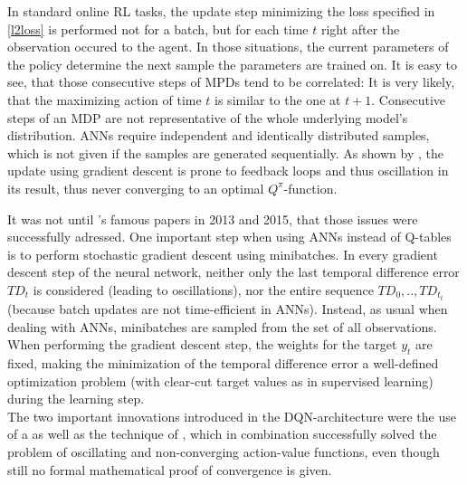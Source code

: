 In standard online RL tasks, the update step minimizing the loss specified in \ref{l2loss} is performed not for a batch, but for each time $t$ right after the observation occured to the agent. 
In those situations, the current parameters of the policy determine the next sample the parameters are trained on. It is easy to see, that those consecutive steps of MPDs tend to be correlated: It is very likely, that the maximizing action of time $t$ is similar to the one at $t+1$. Consecutive steps of an MDP are not representative of the whole underlying model's distribution. ANNs require independent and identically distributed samples, which is not given if the samples are generated sequentially. As shown by \cite{john_n._tsitsiklis_analysis_1997}, the update using gradient descent is prone to feedback loops and thus oscillation in its result, thus never converging to an optimal $Q^\pi$-function. 

It was not until 's famous papers in 2013\cite{mnih_playing_2013} and 2015\cite{mnih_human-level_2015}, that those issues were successfully adressed. One important step when using ANNs instead of Q-tables is to perform stochastic gradient descent using minibatches. In every gradient descent step of the neural network, neither only the last temporal difference error $TD_t$ is considered (leading to oscillations), nor the entire sequence $TD_0, .., TD_{t_t}$ (because batch updates are not time-efficient in ANNs). Instead, as usual when dealing with ANNs, minibatches are sampled from the set of all observations. When performing the gradient descent step, the weights for the target $y_t$ are fixed, making the minimization of the temporal difference error a well-defined optimization problem (with clear-cut target values as in supervised learning) during the learning step.\\


\noindent The two important innovations introduced in the DQN-architecture were the use of a  as well as the technique of , which in combination successfully solved the problem of oscillating and non-converging action-value functions, even though still no formal mathematical proof of convergence is given. %

